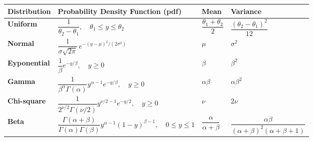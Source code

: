 \documentclass[
  letterpaper,
  DIV=11,
  numbers=noendperiod]{scrartcl}
\begin{document}
\begin{longtable}[]{@{}
  >{\raggedright\arraybackslash}p{}
  >{\raggedright\arraybackslash}p{}
  >{\raggedright\arraybackslash}p{}
  >{\raggedright\arraybackslash}p{}@{}}
\toprule\noalign{}
\begin{minipage}[b]{\linewidth}\raggedright
\textbf{Distribution}
\end{minipage} & \begin{minipage}[b]{\linewidth}\raggedright
\textbf{Probability Density Function (pdf)}
\end{minipage} & \begin{minipage}[b]{\linewidth}\raggedright
\textbf{Mean}
\end{minipage} & \begin{minipage}[b]{\linewidth}\raggedright
\textbf{Variance}
\end{minipage} \\
\midrule\noalign{}
\endhead
\bottomrule\noalign{}
\endlastfoot
\textbf{Uniform} &
\(\dfrac{1}{\theta_2 - \theta_1}, \quad \theta_1 \le y \le \theta_2\) &
\(\dfrac{\theta_1 + \theta_2}{2}\) &
\(\dfrac{(\theta_2 - \theta_1)^2}{12}\) \\
\textbf{Normal} &
\(\dfrac{1}{\sigma \sqrt{2\pi}} \, e^{-(y-\mu)^2/(2\sigma^2)}\) &
\(\mu\) & \(\sigma^2\) \\
\textbf{Eyponential} & \(\dfrac{1}{\beta} e^{-y/\beta}, \quad y \ge 0\)
& \(\beta\) & \(\beta^2\) \\
\textbf{Gamma} &
\(\dfrac{1}{\beta^\alpha \Gamma(\alpha)} y^{\alpha-1} e^{-y/\beta}, \quad y \ge 0\)
& \(\alpha \beta\) & \(\alpha \beta^2\) \\
\textbf{Chi-square} &
\(\dfrac{1}{2^{\nu/2} \Gamma(\nu/2)} y^{\nu/2-1} e^{-y/2}, \quad y \ge 0\)
& \(\nu\) & \(2\nu\) \\
\textbf{Beta} &
\(\dfrac{\Gamma(\alpha+\beta)}{\Gamma(\alpha)\Gamma(\beta)} y^{\alpha-1} (1-y)^{\beta-1}, \quad 0 \le y \le 1\)
& \(\dfrac{\alpha}{\alpha+\beta}\) &
\(\dfrac{\alpha \beta}{(\alpha+\beta)^2 (\alpha+\beta+1)}\) \\
\end{longtable}
\end{document}
